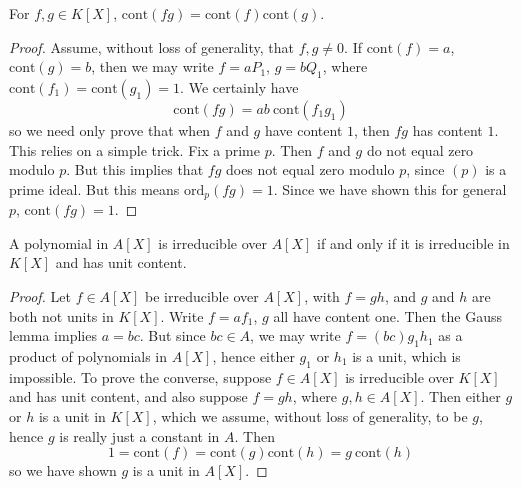 \begin{lemma}[Gauss]
    For $f,g \in K[X]$, $\text{cont}(fg) = \text{cont}(f) \text{cont}(g)$.
\end{lemma}
\begin{proof}
    Assume, without loss of generality, that $f, g \neq 0$. If $\text{cont}(f) = a$, $\text{cont}(g) = b$, then we may write $f = a P_1$, $g = b Q_1$, where $\text{cont}(f_1) = \text{cont}(g_1) = 1$. We certainly have
    \[ \text{cont}(fg) = ab\ \text{cont}(f_1 g_1) \]
    so we need only prove that when $f$ and $g$ have content $1$, then $fg$ has content $1$. This relies on a simple trick. Fix a prime $p$. Then $f$ and $g$ do not equal zero modulo $p$. But this implies that $fg$ does not equal zero modulo $p$, since $(p)$ is a prime ideal. But this means $\text{ord}_p(fg) = 1$. Since we have shown this for general $p$, $\text{cont}(fg) = 1$.
\end{proof}

\begin{corollary}
    A polynomial in $A[X]$ is irreducible over $A[X]$ if and only if it is irreducible in $K[X]$ and has unit content.
\end{corollary}
\begin{proof}
    Let $f \in A[X]$ be irreducible over $A[X]$, with $f = gh$, and $g$ and $h$ are both not units in $K[X]$. Write $f = af_1$, $g$ all have content one. Then the Gauss lemma implies $a = bc$. But since $bc \in A$, we may write $f = (bc) g_1 h_1$ as a product of polynomials in $A[X]$, hence either $g_1$ or $h_1$ is a unit, which is impossible. To prove the converse, suppose $f \in A[X]$ is irreducible over $K[X]$ and has unit content, and also suppose $f = gh$, where $g,h \in A[X]$. Then either $g$ or $h$ is a unit in $K[X]$, which we assume, without loss of generality, to be $g$, hence $g$ is really just a constant in $A$. Then
    \[ 1 = \text{cont}(f) = \text{cont}(g) \text{cont}(h) = g\ \text{cont}(h) \]
    so we have shown $g$ is a unit in $A[X]$.
\end{proof}

